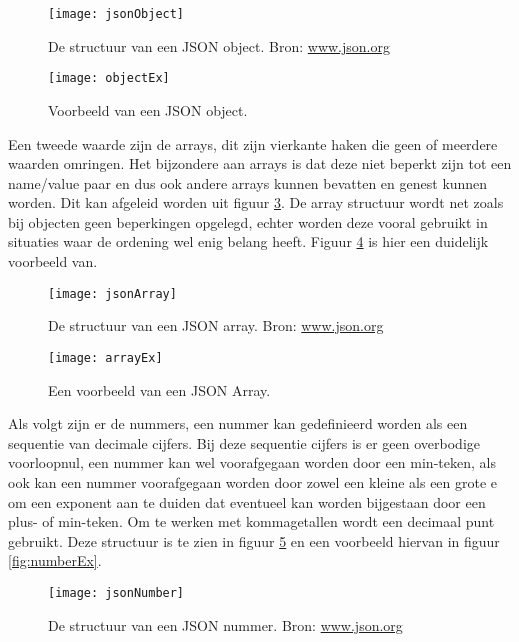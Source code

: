 \begin{figure}[H]
    \centering
\texttt{[image: jsonObject]}
\caption[JSON Object Structuur]{De structuur van een JSON object. Bron: \url{www.json.org}}
    \label{fig:jsonObject}
\end{figure}

\begin{figure}[H]
    \centering
    \texttt{[image: objectEx]}
    \caption[JSON Object]{Voorbeeld van een JSON object.}
    \label{fig:objectEx}
\end{figure}

Een tweede waarde zijn de arrays, dit zijn vierkante haken die geen of meerdere waarden omringen. Het bijzondere aan arrays is dat deze niet beperkt zijn tot een name/value paar en dus ook andere arrays kunnen bevatten en genest kunnen worden. Dit kan afgeleid worden uit figuur \ref{fig:jsonArray}. De array structuur wordt net zoals bij objecten geen beperkingen opgelegd, echter worden deze vooral gebruikt in situaties waar de ordening wel enig belang heeft. Figuur \ref{fig:arrayEx} is hier een duidelijk voorbeeld van.

\begin{figure}[H]
    \centering
    \texttt{[image: jsonArray]}
    \caption[JSON Array Structuur]{De structuur van een JSON array. Bron: \url{www.json.org}}
    \label{fig:jsonArray}
\end{figure}
\begin{figure}[H]
    \centering
    \texttt{[image: arrayEx]}
    \caption[JSON Array]{Een voorbeeld van een JSON Array.}
    \label{fig:arrayEx}
\end{figure}

Als volgt zijn er de nummers, een nummer kan gedefinieerd worden als een sequentie van decimale cijfers. Bij deze sequentie cijfers is er geen overbodige voorloopnul, een nummer kan wel voorafgegaan worden door een min-teken, als ook kan een nummer voorafgegaan worden door zowel een kleine als een grote e om een exponent aan te duiden dat  eventueel kan worden bijgestaan door een plus- of min-teken. Om te werken met kommagetallen wordt een decimaal punt gebruikt. Deze structuur is te zien in figuur \ref{fig:jsonNumber} en een voorbeeld hiervan in figuur \ref{fig:numberEx}.

\begin{figure}[H]
    \centering
    \texttt{[image: jsonNumber]}
    \caption[JSON Nummer Structuur]{De structuur van een JSON nummer. Bron: \url{www.json.org}}
    \label{fig:jsonNumber}
\end{figure}

